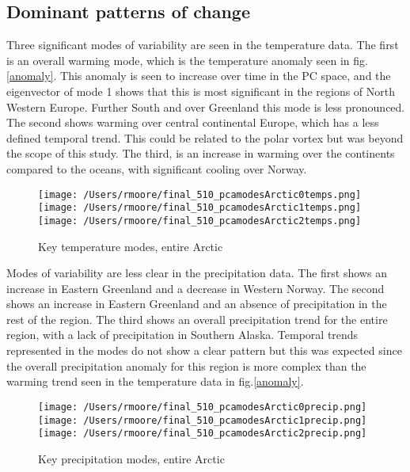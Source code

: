 \documentclass[11pt, oneside]{article}
\begin{document}
\subsection{Dominant patterns of change}
Three significant modes of variability are seen in the temperature data. The first is an overall warming mode, which is the temperature anomaly seen in fig.\ref{anomaly}. This anomaly is seen to increase over time in the PC space, and the eigenvector of mode 1 shows that this is most significant in the regions of North Western Europe. Further South and over Greenland this mode is less pronounced. The second shows warming over central continental Europe, which has a less defined temporal trend. This could be related to the polar vortex \cite{douville2009stratospheric} but was beyond the scope of this study. The third, is an increase in warming over the continents compared to the oceans, with significant cooling over Norway.
 


\begin{figure}[!htb]
    \centering
      \texttt{[image: /Users/rmoore/final\_510\_pcamodesArctic0temps.png]}
    \endminipage 
    \\
      \texttt{[image: /Users/rmoore/final\_510\_pcamodesArctic1temps.png]}
    \endminipage
    \\
      \texttt{[image: /Users/rmoore/final\_510\_pcamodesArctic2temps.png]}
    \endminipage
    \caption{Key temperature modes, entire Arctic}\label{pca_temp}
    \end{figure}

    Modes of variability are less clear in the precipitation data. The first shows an increase in Eastern Greenland and a decrease in Western Norway. The second shows an increase in Eastern Greenland and an absence of precipitation in the rest of the region. The third shows an overall precipitation trend for the entire region, with a  lack of precipitation in Southern Alaska. Temporal trends represented in the modes do not show a clear pattern but this was expected since the overall precipitation anomaly for this region is more complex than the warming trend seen in the temperature data in fig.\ref{anomaly}.
    \begin{figure}[!htb]
        \centering
          \texttt{[image: /Users/rmoore/final\_510\_pcamodesArctic0precip.png]}
        \endminipage 
        \\
          \texttt{[image: /Users/rmoore/final\_510\_pcamodesArctic1precip.png]}
        \endminipage
        \\
          \texttt{[image: /Users/rmoore/final\_510\_pcamodesArctic2precip.png]}
        \endminipage
        \caption{Key precipitation modes, entire Arctic}\label{pca_precip}
        \end{figure}
\end{document}
